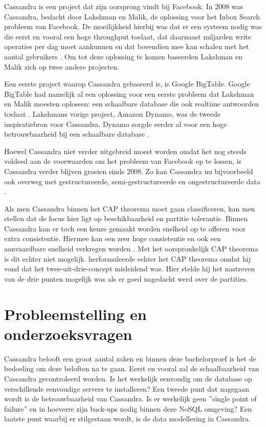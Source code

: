 Cassandra is een project dat zijn oorsprong vindt bij Facebook.
In 2008 was Cassandra, bedacht door Lakshman en Malik, de oplossing voor het Inbox Search probleem van Facebook.
De moeilijkheid hierbij was dat er een systeem nodig was die eerst en vooral een hoge throughput toelaat, dat daarnaast miljarden write operaties per dag moet aankunnen en dat bovendien mee kan schalen met het aantal gebruikers \citep{lakshman2010cassandra}.
Om tot deze oplossing te komen baseerden Lakshman en Malik zich op twee andere projecten.

Een eerste project waarop Cassandra gebaseerd is, is Google BigTable.
Google BigTable had namelijk al een oplossing voor een eerste probleem dat Lakshman en Malik moesten oplossen: een schaalbare database die ook realtime antwoorden toelaat \citep{chang2008bigtable}.
Lakshmans vorige project, Amazon Dynamo, was de tweede inspiratiebron voor Cassandra.
Dynamo zorgde eerder al voor een hoge betrouwbaarheid bij een schaalbare database \citep{decandia2007dynamo}.

Hoewel Cassandra niet verder uitgebreid moest worden omdat het nog steeds voldeed aan de voorwaarden om het probleem van Facebook op te lossen, is Cassandra verder blijven groeien sinds 2008.
Zo kan Cassandra nu bijvoorbeeld ook overweg met gestructureerde, semi-gestructureerde en ongestructureerde data \citep{kan2014cassandra}.

Als men Cassandra binnen het CAP theorema moet gaan classificeren, kan men stellen dat de focus hier ligt op beschikbaarheid en partitie tolerantie.
Binnen Cassandra kan er toch een keuze gemaakt worden snelheid op te offeren voor extra consistentie.
Hiermee kan een zeer hoge consistentie en ook een aanvaardbare snelheid verkregen worden \citep{ellis2009cassandra}.
Met het oorspronkelijk CAP theorema is dit echter niet mogelijk.
\cite{brewer2012cap} herformuleerde echter het CAP theorema omdat hij vond dat het twee-uit-drie-concept misleidend was.
Hier stelde hij het nastreven van de drie punten mogelijk was als er goed nagedacht werd over de partities.

\section{Probleemstelling en onderzoeksvragen}
\label{sec:onderzoeksvragen}


Cassandra belooft een groot aantal zaken en binnen deze bachelorproef is het de bedoeling om deze beloften na te gaan.
Eerst en vooral zal de schaalbaarheid van Cassandra gecontroleerd worden.
Is het werkelijk eenvoudig om de database op verschillende eenvoudige servers te installeren?
Een tweede punt dat nagegaan wordt is de betrouwbaarheid van Cassandra.
Is er werkelijk geen ''single point of failure'' en in hoeverre zijn back-ups nodig binnen deze NoSQL omgeving?
Een laatste punt waarbij er stilgestaan wordt, is de data modellering in Cassandra.